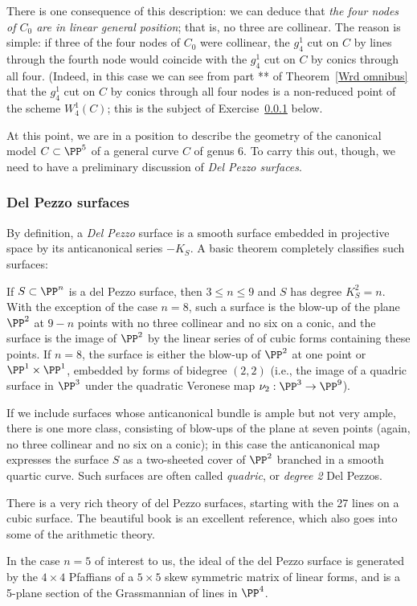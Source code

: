There is one consequence of this description: we can deduce that \emph{the four nodes of $C_0$ are in linear general position}; that is, no three are collinear. The reason is simple: if three of the four nodes of $C_0$ were collinear, the $g^1_4$ cut on $C$ by lines through the fourth node would coincide with the $g^1_4$ cut on $C$ by conics through all four. (Indeed, in this case we can see from part ** of Theorem~\ref{Wrd omnibus} that the $g^1_4$ cut on $C$ by conics through all four nodes is a non-reduced point of the scheme $W^1_4(C)$; this is the subject of Exercise~\ref{} below. 

At this point, we are in a position to describe the geometry of the canonical model $C \subset \PP^5$ of a general curve $C$ of genus 6. To carry this out, though, we need to have a preliminary discussion of \emph{Del Pezzo surfaces}.

\subsubsection{Del Pezzo surfaces}

By definition,
a \emph{Del Pezzo} surface is a smooth surface embedded in projective space by its anticanonical series $-K_S$. A basic theorem completely classifies such surfaces:

\begin{fact}
If $S\subset \PP^n$ is a del Pezzo surface, then
$3\leq n\leq 9$ and $S$ has degree $K_S^2 = n$. With the exception of the case $n=8$, such a surface is the blow-up of the plane $\PP^2$ at $9-n$ points with no three collinear and no six on a conic, 
and the surface is the image of $\PP^2$ by  the linear series of of cubic forms containing these points. If $n=8$, the surface
is either the blow-up of $\PP^2$  at one point or $\PP^1 \times \PP^1$, embedded by forms of bidegree $(2,2)$ (i.e., the image of a quadric surface in $\PP^3$ under the quadratic Veronese map $\nu_2 : \PP^3 \to \PP^9$). 

If we include surfaces whose anticanonical bundle is ample but not very ample, there is one more class, consisting of blow-ups of the plane at seven points (again, no three collinear and no six on a conic); in this case the anticanonical map expresses the surface $S$ as a two-sheeted cover of $\PP^2$ branched in a smooth quartic curve. Such surfaces are often called \emph{quadric}, or \emph{degree 2} Del Pezzos.

There is a very rich theory of del Pezzo surfaces, starting with the 27 lines on a cubic surface. The
beautiful book \cite{Manin} is an excellent reference, which also goes into some of the arithmetic theory.

In the case $n=5$ of interest to us, the ideal of the del Pezzo surface 
is generated by the $4\times 4$ Pfaffians of a $5\times 5$ skew symmetric matrix of linear forms, and is a 5-plane section of the Grassmannian of lines in $\PP^4$.
\end{fact}


